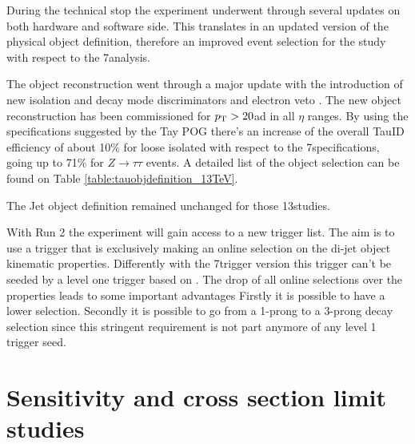 During the technical stop the experiment underwent through several updates on both hardware and software side. This	translates in an updated version of the physical object definition, therefore an improved event selection for the study with respect to the 7\tev analysis.

The \hadtau object reconstruction went through a major update with the introduction of new isolation and decay mode discriminators and electron veto \cite{bib:TauID_13tev}. The new \hadtau object reconstruction has been commissioned for $p_{\text{T}} > 20$\gev ad in all $\eta$ ranges. By using the specifications suggested by the Tay POG there's an increase of the overall TauID efficiency of about 10\% for loose isolated \hadtau with respect to the 7\tev specifications, going up to 71\% for $Z \longrightarrow\tau\tau$ events\cite{bib:TauID_13tev}. A detailed list of the \hadtau object selection can be found on Table \ref{table:tauobjdefinition_13TeV}.

The Jet object definition remained unchanged for those 13\tev studies.


With Run 2 the experiment will gain access to a new trigger list. The aim is to use a trigger that is exclusively making an online selection on the di-jet object kinematic properties. Differently with the 7\tev trigger version this trigger can't be seeded by a level one trigger based on \met. The drop of all online selections over the \hadtau properties leads to some important advantages Firstly it is possible to have a lower \hadtau \pt selection. Secondly it is possible to go from a 1-prong to a 3-prong decay selection since this stringent requirement is not part anymore of any level 1 trigger seed. 

\section{Sensitivity and cross section limit studies}

